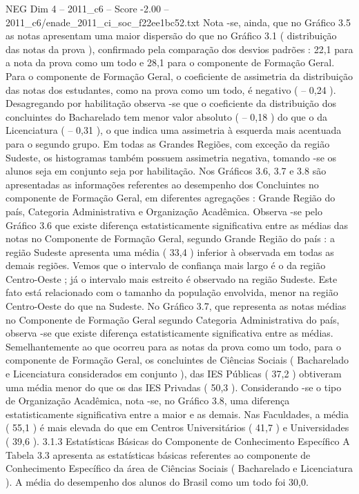 \begin{textsample}{NEG Dim 4 – 2011\_c6 – Score -2.00 – 2011\_c6/enade\_2011\_ci\_soc\_f22ee1bc52.txt}
Nota -se, ainda, que no Gráfico 3.5 as notas apresentam uma maior dispersão do que no Gráfico 3.1 ( distribuição das notas da prova ), confirmado pela comparação dos desvios padrões : 22,1 para a nota da prova como um todo e 28,1 para o componente de Formação Geral.
Para o componente de Formação Geral, o coeficiente de assimetria da distribuição das notas dos estudantes, como na prova como um todo, é negativo ( – 0,24 ).
Desagregando por habilitação observa -se que o coeficiente da distribuição dos concluintes do Bacharelado tem menor valor absoluto ( – 0,18 ) do que o da Licenciatura ( – 0,31 ), o que indica uma assimetria à esquerda mais acentuada para o segundo grupo.
Em todas as Grandes Regiões, com exceção da região Sudeste, os histogramas também possuem assimetria negativa, tomando -se os alunos seja em conjunto seja por habilitação.
Nos Gráficos 3.6, 3.7 e 3.8 são apresentadas as informações referentes ao desempenho dos Concluintes no componente de Formação Geral, em diferentes agregações : Grande Região do país, Categoria Administrativa e Organização Acadêmica.
Observa -se pelo Gráfico 3.6 que existe diferença estatisticamente significativa entre as médias das notas no Componente de Formação Geral, segundo Grande Região do país : a região Sudeste apresenta uma média ( 33,4 ) inferior à observada em todas as demais regiões.
Vemos que o intervalo de confiança mais largo é o da região Centro-Oeste ; já o intervalo mais estreito é observado na região Sudeste.
Este fato está relacionado com o tamanho da população envolvida, menor na região Centro-Oeste do que na Sudeste.
No Gráfico 3.7, que representa as notas médias no Componente de Formação Geral segundo Categoria Administrativa do país, observa -se que existe diferença estatisticamente significativa entre as médias.
Semelhantemente ao que ocorreu para as notas da prova como um todo, para o componente de Formação Geral, os concluintes de Ciências Sociais ( Bacharelado e Licenciatura considerados em conjunto ), das IES Públicas ( 37,2 ) obtiveram uma média menor do que os das IES Privadas ( 50,3 ).
Considerando -se o tipo de Organização Acadêmica, nota -se, no Gráfico 3.8, uma diferença estatisticamente significativa entre a maior e as demais.
Nas Faculdades, a média ( 55,1 ) é mais elevada do que em Centros Universitários ( 41,7 ) e Universidades ( 39,6 ). 3.1.3 Estatísticas Básicas do Componente de Conhecimento Específico A Tabela 3.3 apresenta as estatísticas básicas referentes ao componente de Conhecimento Específico da área de Ciências Sociais ( Bacharelado e Licenciatura ).
A média do desempenho dos alunos do Brasil como um todo foi 30,0.

\end{textsample}
